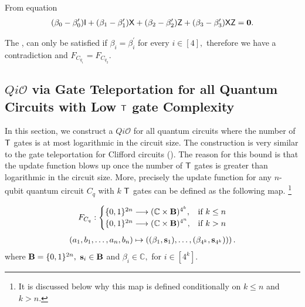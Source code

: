 From equation 
\begin{equation}
\label{lemma:1qubit:eq5}
\begin{aligned}
(\beta_0-\beta_0^\prime) {\sf I}+(\beta_1 -\beta_1^\prime){\sf X}+(\beta_2-\beta_2^\prime) {\sf Z}+(\beta_3-\beta^\prime_3) {\sf X} {\sf Z}={\bf 0}.
\end{aligned}
\end{equation}

The  ,  can only be satisfied if $\beta_i = \beta_i^\prime$ for every $i\in[4],$ therefore we have a contradiction and $F_{C_{q_1}}=F_{C_{q_2}}.$



\subsection{$Qi\mathcal{O}$ via Gate Teleportation for all Quantum Circuits with Low ${\sf T}$ gate Complexity }
\label{sec:n-qubit-circuits}
In this section, we construct a $Qi\mathcal{O}$ for all quantum circuits where the number of ${\sf T}$ gates is at most logarithmic in the circuit size. The construction is very similar to the gate teleportation for Clifford circuits (). The reason for this bound is that the update function blows up once the number of ${\sf T}$ gates is greater than logarithmic in the circuit size. More, precisely the update function for any $n$-qubit quantum circuit $C_q$ with $k$ ${\sf T}$ gates can be defined as the following map. \footnote{It is discussed below why this map is defined conditionally on $k\leq n$ and $k>n$.}


\begin{equation}
\label{nqubit:eq0}
\begin{aligned}
 F_{C_q}:
\begin{cases}
    \{0,1\}^{2n}\longrightarrow  (\mathbb{C} \times {\bf B})^{4^k},& \text{if } k\leq n\\
     \{0,1\}^{2n}\longrightarrow  (\mathbb{C} \times {\bf B})^{4^n}, & \text{if } k> n\\
\end{cases}
\end{aligned}
\end{equation}
\begin{equation}
\begin{aligned}
 (a_1,b_1,\ldots, a_n,b_n) \mapsto \left((\beta_1, {\bf s}_1),\dots, (\beta_{4^k}, {\bf s}_{4^k}))\right).
\end{aligned}
\end{equation}
where  ${\bf B}=\{0,1\}^{2n},$ ${\bf s}_i\in{\bf B}$ and $\beta_i\in\mathbb{C},$ for $i\in [4^k].$

